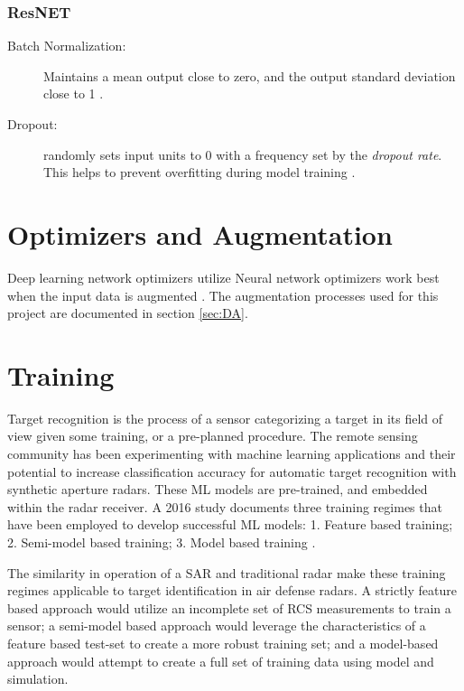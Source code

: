 		\subsubsection{ResNET}

			\begin{description}
				\item [Batch Normalization: ]  Maintains a mean output close to zero, and the output standard deviation close to 1 \cite{Keras}.
				\item [Dropout: ] randomly sets input units to 0 with a frequency set by the \textit{dropout rate}. This helps to prevent overfitting during model training \cite{Keras}.
			\end{description}


\section{Optimizers and Augmentation}

Deep learning network optimizers utilize Neural network optimizers work best when the input data is augmented \cite{ML_RCS}. The augmentation processes used for this project are documented in section \ref{sec:DA}.

\section{Training}
\label{sec:training}

	Target recognition is the process of a sensor categorizing a target in its field of view given some training, or a pre-planned procedure. The remote sensing community has been experimenting with machine learning applications and their potential to increase classification accuracy for automatic target recognition with synthetic aperture radars. These ML models are pre-trained, and embedded within the radar receiver. A 2016 study documents three training regimes that have been employed to develop successful ML models:  1. Feature based training; 2. Semi-model based training; 3. Model based training \cite{SAR_Survey}.

	The similarity in operation of a SAR and traditional radar make these training regimes applicable to target identification in air defense radars. A strictly feature based approach would utilize an incomplete set of RCS measurements to train a sensor; a semi-model based approach would leverage the characteristics of a feature based test-set to create a more robust training set; and a model-based approach would attempt to create a full set of training data using model and simulation.

